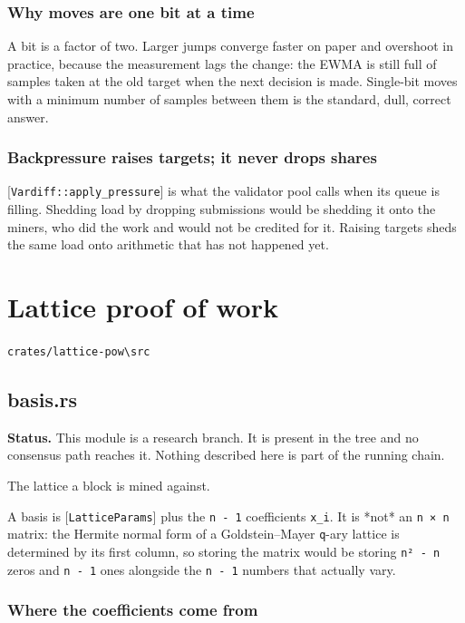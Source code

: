 \documentclass[11pt,a4paper]{article}
\begin{document}
\subsubsection{Why moves are one bit at a time}

A bit is a factor of two. Larger jumps converge faster on paper and overshoot
in practice, because the measurement lags the change: the EWMA is still full
of samples taken at the old target when the next decision is made. Single-bit
moves with a minimum number of samples between them is the standard, dull,
correct answer.

\subsubsection{Backpressure raises targets; it never drops shares}

[\texttt{Vardiff::apply\_pressure}] is what the validator pool calls when its queue
is filling. Shedding load by dropping submissions would be shedding it onto
the miners, who did the work and would not be credited for it. Raising
targets sheds the same load onto arithmetic that has not happened yet.

\section{Lattice proof of work}
\noindent\texttt{crates/lattice-pow\textbackslash{}src}

\subsection{basis.rs}
\begin{framed}\noindent\textbf{Status.} This module is a research branch. It is present in the tree and no consensus path reaches it. Nothing described here is part of the running chain.\end{framed}

The lattice a block is mined against.

A basis is [\texttt{LatticeParams}] plus the \texttt{n - 1} coefficients \texttt{x\_i}. It is
*not* an \texttt{n × n} matrix: the Hermite normal form of a Goldstein–Mayer
\texttt{q}-ary lattice is determined by its first column, so storing the matrix
would be storing \texttt{n² - n} zeros and \texttt{n - 1} ones alongside the \texttt{n - 1}
numbers that actually vary.

\subsubsection{Where the coefficients come from}
\end{document}
